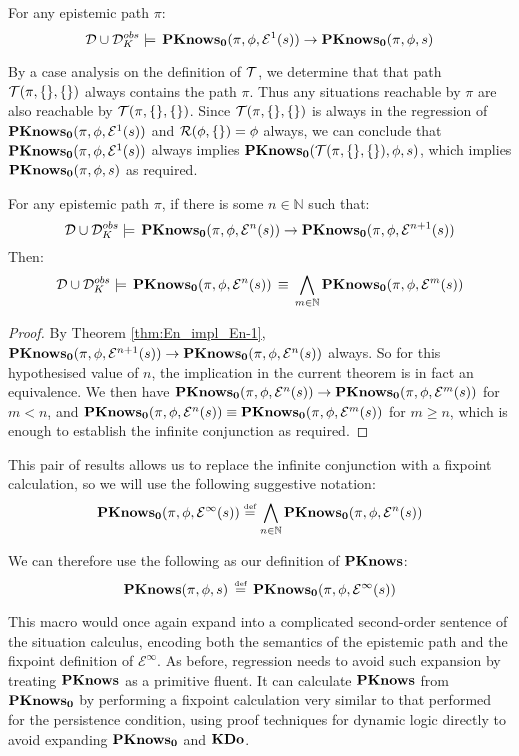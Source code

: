 \begin{thm}
\label{thm:En_impl_En-1}For any epistemic path $\pi$: \[
\mathcal{D}\cup\mathcal{D}_{K}^{obs}\models\,\mathbf{PKnows_{0}}(\pi,\phi,\mathcal{E}^{1}(s))\rightarrow\mathbf{PKnows_{0}}(\pi,\phi,s)\]

\end{thm}
\begin{proofsketch}
By a case analysis on the definition of $\mathcal{T}$, we determine that
that path $\mathcal{T}(\pi,\{\},\{\})$ always contains the path $\pi$.
Thus any situations reachable by $\pi$ are also reachable by $\mathcal{T}(\pi,\{\},\{\})$.
Since $\mathcal{T}(\pi,\{\},\{\})$ is always in the regression of $\mathbf{PKnows_{0}}(\pi,\phi,\mathcal{E}^{1}(s))$
and $\mathcal{R}(\phi,\{\})=\phi$ always, we can conclude that $\mathbf{PKnows_{0}}(\pi,\phi,\mathcal{E}^{1}(s))$
always implies $\mathbf{PKnows_{0}}(\mathcal{T}(\pi,\{\},\{\}),\phi,s)$, which implies
$\mathbf{PKnows_{0}}(\pi,\phi,s)$ as required.
\end{proofsketch}
\begin{thm}
For any epistemic path $\pi$, if there is some $n\in\mathbb{N}$
such that:\[
\mathcal{D}\cup\mathcal{D}_{K}^{obs}\models\,\mathbf{PKnows_{0}}(\pi,\phi,\mathcal{E}^{n}(s))\rightarrow\mathbf{PKnows_{0}}(\pi,\phi,\mathcal{E}^{n+1}(s))\]
Then:\[
\mathcal{D}\cup\mathcal{D}_{K}^{obs}\models\,\mathbf{PKnows_{0}}(\pi,\phi,\mathcal{E}^{n}(s))\,\equiv\,\bigwedge_{m\in\mathbb{N}}\mathbf{PKnows_{0}}(\pi,\phi,\mathcal{E}^{m}(s))\]

\end{thm}
\begin{proof}
By Theorem \ref{thm:En_impl_En-1}, $\mathbf{PKnows_{0}}(\pi,\phi,\mathcal{E}^{n+1}(s))\rightarrow\mathbf{PKnows_{0}}(\pi,\phi,\mathcal{E}^{n}(s))$
always. So for this hypothesised value of $n$, the implication in
the current theorem is in fact an equivalence. We then have $\mathbf{PKnows_{0}}(\pi,\phi,\mathcal{E}^{n}(s))\rightarrow\mathbf{PKnows_{0}}(\pi,\phi,\mathcal{E}^{m}(s))$
for $m<n$, and $\mathbf{PKnows_{0}}(\pi,\phi,\mathcal{E}^{n}(s))\equiv\mathbf{PKnows_{0}}(\pi,\phi,\mathcal{E}^{m}(s))$
for $m\geq n$, which is enough to establish the infinite conjunction
as required.
\end{proof}
This pair of results allows us to replace the infinite conjunction
with a fixpoint calculation, so we will use the following suggestive
notation:\[
\mathbf{PKnows_{0}}(\pi,\phi,\mathcal{E}^{\infty}(s))\stackrel{\mbox{\tiny def}}{=}\bigwedge_{n\in\mathbb{N}}\mathbf{PKnows_{0}}(\pi,\phi,\mathcal{E}^{n}(s))\]


We can therefore use the following as our definition of $\mathbf{PKnows}$:\[
\mathbf{PKnows}(\pi,\phi,s)\,\stackrel{\mbox{\tiny def}}{=}\,\mathbf{PKnows_{0}}(\pi,\phi,\mathcal{E}^{\infty}(s))\]


This macro would once again expand into a complicated second-order
sentence of the situation calculus, encoding both the semantics of
the epistemic path and the fixpoint definition of $\mathcal{E}^{\infty}$.
As before, regression needs to avoid such expansion by treating $\mathbf{PKnows}$
as a primitive fluent. It can calculate $\mathbf{PKnows}$ from $\mathbf{PKnows_{0}}$
by performing a fixpoint calculation very similar to that performed
for the persistence condition, using proof techniques for dynamic
logic directly to avoid expanding $\mathbf{PKnows_{0}}$ and $\mathbf{KDo}$.

